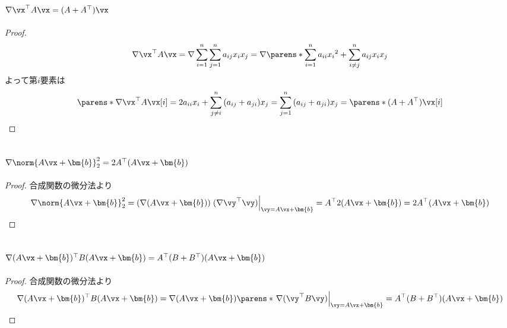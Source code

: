         \subsection{\texorpdfstring{$\nabla \vx^\top A\vx = (A+A^\top)\vx$}{∇ x\string⊤ Ax}}
            \begin{proof}
                \[\nabla \vx^\top A\vx = \nabla\sum_{i=1}^{n}{\sum_{j=1}^{n}{a_{ij}x_ix_j}} = \nabla\parens*{\sum_{i=1}^{n}{a_{ii}{x_i}^2} + \sum_{i\neq j}^{n}{a_{ij}x_ix_j}}\]
                よって第$i$要素は
                \[\parens*{\nabla \vx^\top A\vx}[i] = 2a_{ii}x_i + \sum_{j\neq i}^{n}{(a_{ij}+a_{ji})x_j} = \sum_{j=1}^{n}{(a_{ij}+a_{ji})x_j} = \parens*{(A+A^\top)\vx}[i]\]
            \end{proof}
        \subsection{\texorpdfstring{$\nabla\norm{A\vx+\bm{b}}_2^2 = 2A^\top(A\vx+\bm{b})$}{∇||Ax+b||\_2\string^2 = 2A\string^⊤(Ax+b)}}
            \begin{proof}
                合成関数の微分法より
                \[ \nabla \norm{A\vx+\bm{b}}_2^2 = (\nabla(A\vx+\bm{b}))\left.(\nabla\vy^\top\vy)\right|_{\vy=A\vx+\bm{b}} = A^\top 2(A\vx+\bm{b}) = 2A^\top(A\vx+\bm{b}) \]
            \end{proof}
        \subsection{\texorpdfstring{$\nabla (A\vx+\bm{b})^\top B(A\vx+\bm{b}) = A^\top(B+B^\top)(A\vx+\bm{b})$}{∇ (Ax+b)\string^⊤ B(Ax+b) = A\string^⊤ (B+B\string^⊤)(Ax+b)}}
            \begin{proof}
                合成関数の微分法より
                \[ \nabla (A\vx+\bm{b})^\top B(A\vx+\bm{b}) = \nabla(A\vx + \bm{b})\parens*{\left.\nabla(\vy^\top B\vy)\right|_{\vy=A\vx+\bm{b}}} = A^\top(B+B^\top)(A\vx+\bm{b}) \]
            \end{proof}
